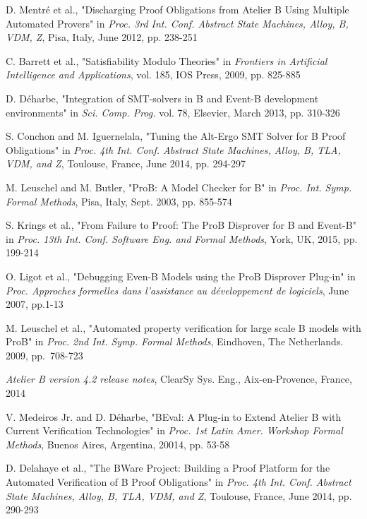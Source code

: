 \documentclass[11pt,journal]{IEEEtran}
\begin{document}
\begin{thebibliography}{1}
		D. Mentr\'{e} et al., "Discharging Proof Obligations from Atelier B Using Multiple Automated Provers" in \emph{Proc. 3rd Int. Conf. Abstract State Machines, Alloy, B, VDM, Z}, Pisa, Italy, June 2012, pp. 238-251
		
		C. Barrett et al., "Satisfiability Modulo Theories" in \emph{Frontiers in Artificial Intelligence and Applications}, vol. 185, IOS Press, 2009, pp. 825-885
		
		D. D\'{e}harbe, "Integration of SMT-solvers in B and Event-B development environments" in \emph{Sci. Comp. Prog.} vol. 78, Elsevier, March 2013, pp. 310-326
		
		S. Conchon and M. Iguernelala, "Tuning the Alt-Ergo SMT Solver for B Proof Obligations" in \emph{Proc. 4th Int. Conf. Abstract State Machines, Alloy, B, TLA, VDM, and Z}, Toulouse, France, June 2014, pp. 294-297
		
		M. Leuschel and M. Butler, "ProB: A Model Checker for B" in \emph{Proc. Int. Symp. Formal Methods}, Pisa, Italy, Sept. 2003, pp. 855-574 
		
		S. Krings et al., "From Failure to Proof: The ProB Disprover for B and Event-B" in \emph{Proc. 13th Int. Conf. Software Eng. and Formal Methods}, York, UK, 2015, pp. 199-214
		
		O. Ligot et al., "Debugging Even-B Models using the ProB Disprover Plug-in" in \emph{Proc. Approches formelles dans l'assistance au d\'{e}veloppement de logiciels}, June 2007, pp.1-13
		
		M. Leuschel et al., "Automated property verification for large scale B models with ProB" in \emph{Proc. 2nd Int. Symp. Formal Methods}, Eindhoven, The Netherlands. 2009, pp.~708-723
		
		\emph{Atelier B version 4.2 release notes}, ClearSy Sys. Eng., Aix-en-Provence, France, 2014
		
		V. Medeiros Jr. and D. D\'{e}harbe, "BEval: A Plug-in to Extend Atelier B with Current Verification Technologies" in \emph{Proc. 1st Latin Amer. Workshop Formal Methods}, Buenos Aires, Argentina, 20014, pp. 53-58
		
		D. Delahaye et al., "The BWare Project: Building a Proof Platform for the Automated Verification of B Proof Obligations" in \emph{Proc. 4th Int. Conf. Abstract State Machines, Alloy, B, TLA, VDM, and Z}, Toulouse, France, June 2014, pp. 290-293
		
		
	\end{thebibliography}
	
\end{document}
